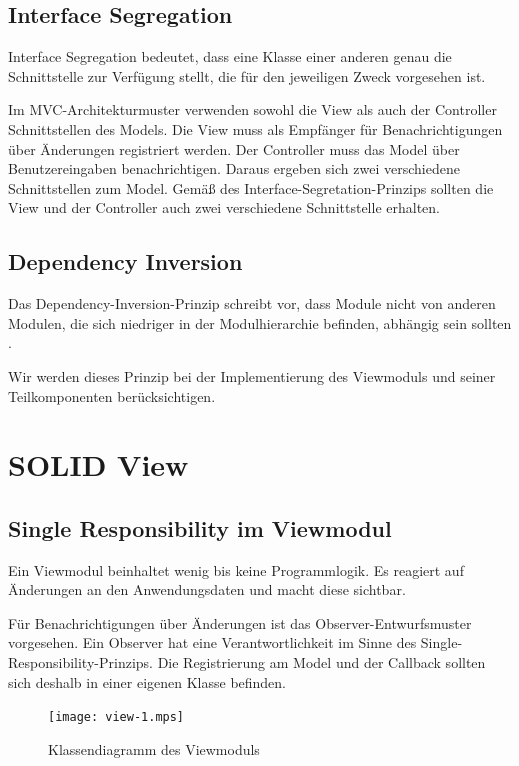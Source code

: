 \documentclass{vldb}
\begin{document}
\subsection{Interface Segregation}
Interface Segregation bedeutet, dass eine Klasse einer anderen genau die Schnittstelle zur Verfügung stellt, die für den jeweiligen Zweck vorgesehen ist.

Im MVC-Architekturmuster verwenden sowohl die View als auch der Controller Schnittstellen des Models. Die View muss als Empfänger für Benachrichtigungen über Än\-de\-run\-gen registriert werden. Der Controller muss das Model über Benutzereingaben benachrichtigen. Daraus ergeben sich zwei verschiedene Schnittstellen zum Model. Gemäß des Interface-Segretation-Prinzips sollten die View und der Controller auch zwei verschiedene Schnittstelle erhalten.

\subsection{Dependency Inversion}
\label{dipsec}
Das Dependency-Inversion-Prinzip schreibt vor, dass Mo\-dule nicht von anderen Modulen, die sich niedriger in der Modulhierarchie befinden, abhängig sein sollten \cite[S.~127]{Marti13}.

Wir werden dieses Prinzip bei der Implementierung des Viewmoduls und seiner Teilkomponenten berücksichtigen.

\section{SOLID View}
\label{solidviewsec}
\subsection{Single Responsibility im Viewmodul}
Ein Viewmodul beinhaltet wenig bis keine Programmlogik. Es re\-a\-giert auf Änderungen an den Anwendungsdaten und macht diese sichtbar.

Für Benachrichtigungen über Änderungen ist das Obser\-ver-Entwurfsmuster vorgesehen. Ein Observer hat eine Verantwortlichkeit im Sinne des Single-Re\-spon\-si\-bi\-li\-ty-Prinzips. Die Registrierung am Model und der Callback sollten sich deshalb in einer eigenen Klasse befinden.

\begin{figure}[h]
  \centering
  \texttt{[image: view-1.mps]}
  \caption{Klassendiagramm des Viewmoduls}
  \label{viewmps}
\end{figure}
\end{document}
